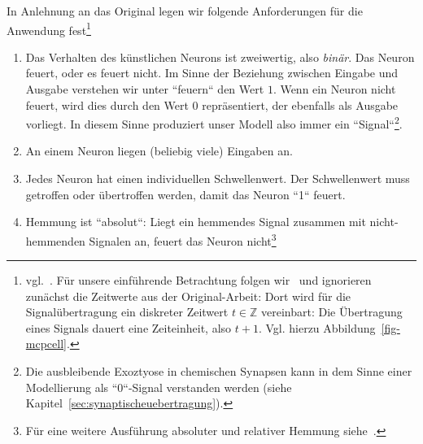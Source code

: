 In Anlehnung an das Original legen wir folgende Anforderungen für die Anwendung fest\footnote{
    vgl.~\cite[26 f.]{Fau94}. Für unsere einführende Betrachtung folgen wir~\cite[33 f.]{Roj93} und ignorieren zunächst die Zeitwerte aus der Original-Arbeit: Dort wird für die Signalübertragung ein diskreter Zeitwert $t \in \mathbb{Z}$ vereinbart: Die Übertragung eines Signals dauert eine Zeiteinheit, also $t + 1$. Vgl. hierzu Abbildung~\ref{fig-mcpcell}.
}
\begin{enumerate}
    \item Das Verhalten des künstlichen Neurons ist zweiwertig, also \textit{binär}. Das Neuron feuert, oder es feuert nicht. Im Sinne der Beziehung zwischen Eingabe und Ausgabe verstehen wir unter ``feuern`` den Wert $1$. Wenn ein Neuron nicht feuert, wird dies durch den Wert $0$ repräsentiert, der ebenfalls als Ausgabe vorliegt. In diesem Sinne produziert unser Modell also immer ein ``Signal``\footnote{
        Die ausbleibende Exoztyose in chemischen Synapsen kann in dem Sinne einer Modellierung als ``0``-Signal verstanden werden (siehe Kapitel~\ref{sec:synaptischeuebertragung}).
    }.
    \item An einem Neuron liegen (beliebig viele) Eingaben an.
    \item Jedes Neuron hat einen individuellen Schwellenwert. Der Schwellenwert muss getroffen oder übertroffen werden, damit das Neuron ``1`` feuert.
    \item Hemmung ist ``absolut``: Liegt ein hemmendes Signal zusammen mit nicht-hemmenden Signalen an, feuert das Neuron nicht\footnote{
        Für eine weitere Ausführung absoluter und relativer Hemmung siehe~\cite[42 f.]{Roj93}.
    }
\end{enumerate}


